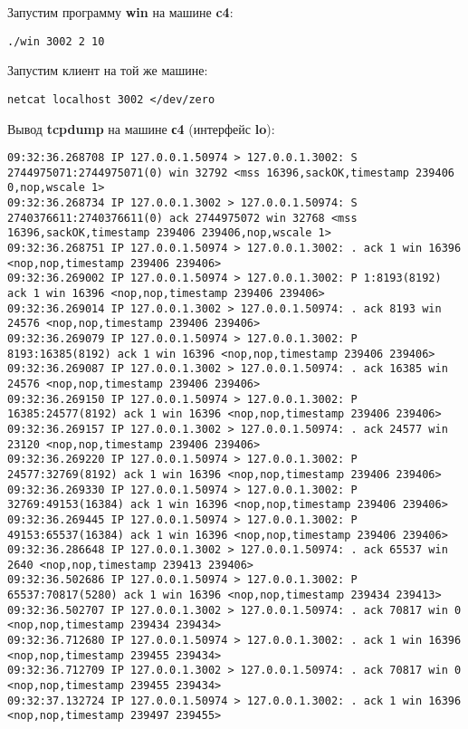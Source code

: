 \documentclass[a4paper,12pt]{article}
\begin{document}
Запустим программу \textbf{win} на машине \textbf{c4}:
\begin{Verbatim}
./win 3002 2 10
\end{Verbatim}

Запустим клиент на той же машине:
\begin{Verbatim}
netcat localhost 3002 </dev/zero
\end{Verbatim}

Вывод \textbf{tcpdump} на машине \textbf{с4} (интерфейс \textbf{lo}):
\begin{Verbatim}
09:32:36.268708 IP 127.0.0.1.50974 > 127.0.0.1.3002: S 2744975071:2744975071(0) win 32792 <mss 16396,sackOK,timestamp 239406 0,nop,wscale 1>
09:32:36.268734 IP 127.0.0.1.3002 > 127.0.0.1.50974: S 2740376611:2740376611(0) ack 2744975072 win 32768 <mss 16396,sackOK,timestamp 239406 239406,nop,wscale 1>
09:32:36.268751 IP 127.0.0.1.50974 > 127.0.0.1.3002: . ack 1 win 16396 <nop,nop,timestamp 239406 239406>
09:32:36.269002 IP 127.0.0.1.50974 > 127.0.0.1.3002: P 1:8193(8192) ack 1 win 16396 <nop,nop,timestamp 239406 239406>
09:32:36.269014 IP 127.0.0.1.3002 > 127.0.0.1.50974: . ack 8193 win 24576 <nop,nop,timestamp 239406 239406>
09:32:36.269079 IP 127.0.0.1.50974 > 127.0.0.1.3002: P 8193:16385(8192) ack 1 win 16396 <nop,nop,timestamp 239406 239406>
09:32:36.269087 IP 127.0.0.1.3002 > 127.0.0.1.50974: . ack 16385 win 24576 <nop,nop,timestamp 239406 239406>
09:32:36.269150 IP 127.0.0.1.50974 > 127.0.0.1.3002: P 16385:24577(8192) ack 1 win 16396 <nop,nop,timestamp 239406 239406>
09:32:36.269157 IP 127.0.0.1.3002 > 127.0.0.1.50974: . ack 24577 win 23120 <nop,nop,timestamp 239406 239406>
09:32:36.269220 IP 127.0.0.1.50974 > 127.0.0.1.3002: P 24577:32769(8192) ack 1 win 16396 <nop,nop,timestamp 239406 239406>
09:32:36.269330 IP 127.0.0.1.50974 > 127.0.0.1.3002: P 32769:49153(16384) ack 1 win 16396 <nop,nop,timestamp 239406 239406>
09:32:36.269445 IP 127.0.0.1.50974 > 127.0.0.1.3002: P 49153:65537(16384) ack 1 win 16396 <nop,nop,timestamp 239406 239406>
09:32:36.286648 IP 127.0.0.1.3002 > 127.0.0.1.50974: . ack 65537 win 2640 <nop,nop,timestamp 239413 239406>
09:32:36.502686 IP 127.0.0.1.50974 > 127.0.0.1.3002: P 65537:70817(5280) ack 1 win 16396 <nop,nop,timestamp 239434 239413>
09:32:36.502707 IP 127.0.0.1.3002 > 127.0.0.1.50974: . ack 70817 win 0 <nop,nop,timestamp 239434 239434>
09:32:36.712680 IP 127.0.0.1.50974 > 127.0.0.1.3002: . ack 1 win 16396 <nop,nop,timestamp 239455 239434>
09:32:36.712709 IP 127.0.0.1.3002 > 127.0.0.1.50974: . ack 70817 win 0 <nop,nop,timestamp 239455 239434>
09:32:37.132724 IP 127.0.0.1.50974 > 127.0.0.1.3002: . ack 1 win 16396 <nop,nop,timestamp 239497 239455>

\end{Verbatim}
\end{document}
